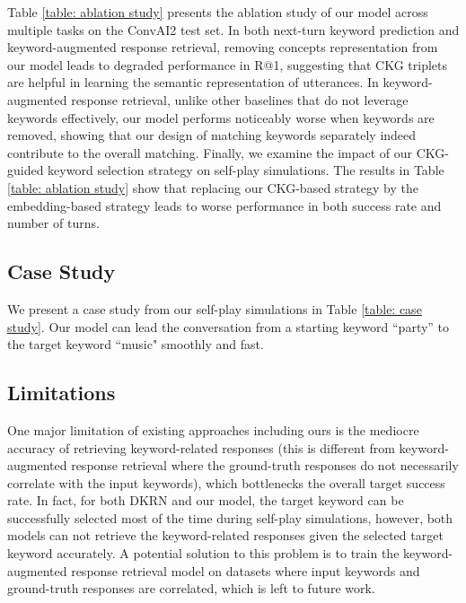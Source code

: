 \documentclass[letterpaper]{article} %
\begin{document}
Table \ref{table: ablation study} presents the ablation study of our model across multiple tasks on the ConvAI2 test set. In both next-turn keyword prediction and keyword-augmented response retrieval, removing concepts representation from our model leads to degraded performance in R@1, suggesting that CKG triplets are helpful in learning the semantic representation of utterances. In keyword-augmented response retrieval, unlike other baselines that do not leverage keywords effectively, our model performs noticeably worse when keywords are removed, showing that our design of matching keywords separately indeed contribute to the overall matching. Finally, we examine the impact of our CKG-guided keyword selection strategy on self-play simulations. The results in Table \ref{table: ablation study} show that replacing our CKG-based strategy by the embedding-based strategy \cite{tang2019target, qin2020dynamic} leads to worse performance in both success rate and number of turns.

\subsection{Case Study}
\label{sec: case study}
We present a case study from our self-play simulations in Table \ref{table: case study}. Our model can lead the conversation from a starting keyword ``party'' to the target keyword ``music" smoothly and fast.

\subsection{Limitations}
\label{sec: limitations}
One major limitation of existing approaches including ours is the mediocre accuracy of retrieving keyword-related responses (this is different from keyword-augmented response retrieval where the ground-truth responses do not necessarily correlate with the input keywords), which bottlenecks the overall target success rate. In fact, for both DKRN and our model, the target keyword can be successfully selected most of the time during self-play simulations, however, both models can not retrieve the keyword-related responses given the selected target keyword accurately. A potential solution to this problem is to train the keyword-augmented response retrieval model on datasets where input keywords and ground-truth responses are correlated, which is left to future work.
\end{document}
